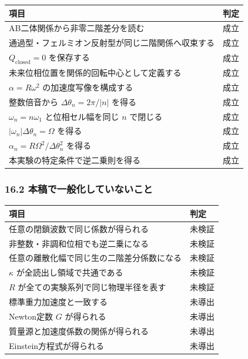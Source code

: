 \documentclass[
  a4paper,
]{ltjsarticle}
\newcounter{none} %
\begin{document}
{\def\LTcaptype{none} %
\begin{longtable}[]{@{}ll@{}}
\toprule\noalign{}
項目 & 判定 \\
\midrule\noalign{}
\endhead
\bottomrule\noalign{}
\endlastfoot
AB二体関係から非零二階差分を読む & 成立 \\
通過型・フェルミオン反射型が同じ二階関係へ収束する & 成立 \\
\(Q_{\mathrm{closed}}=0\) を保存する & 成立 \\
未来位相位置を関係的回転中心として定義する & 成立 \\
\(\alpha=R\omega^2\) の加速度写像を構成する & 成立 \\
整数倍音から \(\Delta\theta_n=2\pi/\lvert n\rvert\) を得る & 成立 \\
\(\omega_n=n\omega_1\) と位相セル幅を同じ \(n\) で閉じる & 成立 \\
\(\lvert\omega_n\rvert\Delta\theta_n=\Omega\) を得る & 成立 \\
\(\alpha_n=R\Omega^2/\Delta\theta_n^2\) を得る & 成立 \\
本実験の特定条件で逆二乗則を得る & 成立 \\
\end{longtable}
}

\subsubsection{16.2
本稿で一般化していないこと}\label{ux672cux7a3fux3067ux4e00ux822cux5316ux3057ux3066ux3044ux306aux3044ux3053ux3068}

{\def\LTcaptype{none} %
\begin{longtable}[]{@{}ll@{}}
\toprule\noalign{}
項目 & 判定 \\
\midrule\noalign{}
\endhead
\bottomrule\noalign{}
\endlastfoot
任意の閉鎖波数で同じ係数が得られる & 未検証 \\
非整数・非調和位相でも逆二乗になる & 未検証 \\
任意の離散化幅で同じ生の二階差分係数になる & 未検証 \\
\(\kappa\) が全読出し領域で共通である & 未検証 \\
\(R\) が全ての実験系列で同じ物理半径を表す & 未検証 \\
標準重力加速度と一致する & 未導出 \\
Newton定数 \(G\) が得られる & 未導出 \\
質量源と加速度係数の関係が得られる & 未導出 \\
Einstein方程式が得られる & 未導出 \\
\end{longtable}
}
\end{document}

